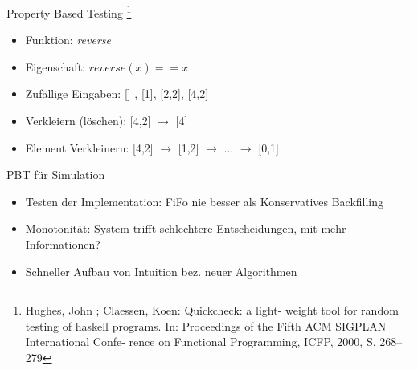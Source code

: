 \documentclass[aspectratio=169,10pt]{beamer}
\begin{document}
\begin{frame}[t, fragile]{Property Based Testing \footnote{Hughes, John ; Claessen, Koen: Quickcheck: a light-
		weight tool for random testing of haskell programs. In:
		Proceedings of the Fifth ACM SIGPLAN International Confe-
		rence on Functional Programming, ICFP, 2000, S. 268–279}}
\begin{itemize}[<+->]
	\item Funktion: \emph{reverse}
	\item Eigenschaft: $reverse(x) == x$
	\item Zuf\"allige Eingaben: [] , [1], [2,2], [4,2]\lightning
	\item Verkleiern (l\"oschen): [4,2] $\rightarrow$ [4] \lightning
	\item Element Verkleinern: [4,2] $\rightarrow$ [1,2] $\rightarrow$ ... $\rightarrow$ [0,1]
\end{itemize}
\end{frame}

\begin{frame}[t, fragile]{PBT f\"ur Simulation}
\begin{itemize}[<+->]
	\item Testen der Implementation: FiFo nie besser als Konservatives Backfilling
	\item Monotonit\"at: System trifft schlechtere  Entscheidungen, mit mehr Informationen?
	\item Schneller Aufbau von Intuition bez. neuer Algorithmen
\end{itemize}
\end{frame}
\end{document}
